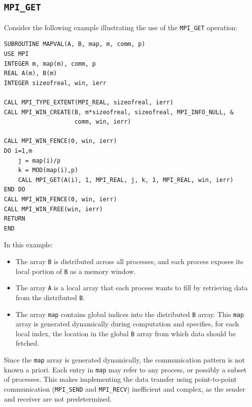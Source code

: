 \documentclass[12pt]{book}
\begin{document}
\subsection{\texttt{MPI\_GET}}
 Consider the following example illustrating the use of the \texttt{MPI\_GET} operation:
\begin{lstlisting}[style=cppstyle]
SUBROUTINE MAPVAL(A, B, map, m, comm, p)
USE MPI
INTEGER m, map(m), comm, p
REAL A(m), B(m)
INTEGER sizeofreal, win, ierr

CALL MPI_TYPE_EXTENT(MPI_REAL, sizeofreal, ierr)
CALL MPI_WIN_CREATE(B, m*sizeofreal, sizeofreal, MPI_INFO_NULL, &
                    comm, win, ierr)

CALL MPI_WIN_FENCE(0, win, ierr)
DO i=1,m
    j = map(i)/p
    k = MOD(map(i),p)
    CALL MPI_GET(A(i), 1, MPI_REAL, j, k, 1, MPI_REAL, win, ierr)
END DO
CALL MPI_WIN_FENCE(0, win, ierr)
CALL MPI_WIN_FREE(win, ierr)
RETURN
END
\end{lstlisting}

In this example:
\begin{itemize}
    \item The array \texttt{B} is distributed across all processes, and each process exposes its local portion of \texttt{B} as a memory window.
    \item The array \texttt{A} is a local array that each process wants to fill by retrieving data from the distributed \texttt{B}.
    \item The array \texttt{map} contains global indices into the distributed \texttt{B} array. This \texttt{map} array is generated dynamically during computation and specifies, for each local index, the location in the global \texttt{B} array from which data should be fetched.
\end{itemize}

Since the \texttt{map} array is generated dynamically, the communication pattern is not known a priori. Each entry in \texttt{map} may refer to any process, or possibly a subset of processes. This makes implementing the data transfer using point-to-point communication (\texttt{MPI\_SEND} and \texttt{MPI\_RECV}) inefficient and complex, as the sender and receiver are not predetermined.
\end{document}
